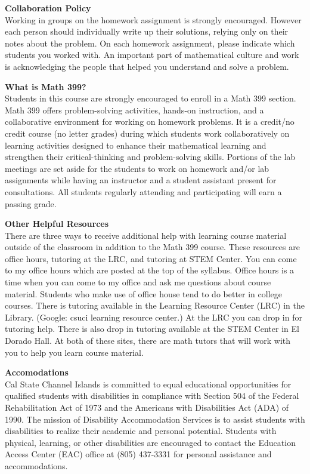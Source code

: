 \documentclass[11pt]{article}
\begin{document}
{\bf Collaboration Policy} \\
Working in groups on the homework assignment is strongly encouraged.  However each person should individually write up their solutions, relying only on their notes about the problem.  On each homework assignment, please indicate which students you worked with.  An important part of mathematical culture and work is acknowledging the people that helped you understand and solve a problem.




{\bf What is Math 399?} \\
Students in this course are strongly encouraged to enroll in a Math 399 section. Math 399 offers problem-solving activities, hands-on instruction, and a collaborative environment for working on homework problems. It is a credit/no credit course (no letter grades) during which students work collaboratively on learning activities designed to enhance their mathematical learning and strengthen their critical-thinking and problem-solving skills. Portions of the lab meetings are set aside for the students to work on homework and/or lab assignments while having an instructor and a student assistant present for consultations. All students regularly attending and participating will earn a passing grade.

{\bf Other Helpful Resources} \\
There are three ways to receive additional help with learning course material outside of the classroom in addition to the Math 399 course.  These resources are office hours, tutoring at the LRC, and tutoring at STEM Center. You can come to my office hours which are posted at the top of the syllabus.  Office hours is a time when you can come to my office and ask me questions about course material.  Students who make use of office house tend to do better in college courses. There is tutoring available in the Learning Resource Center (LRC) in the Library.  (Google: csuci learning resource center.)  At the LRC you can drop in for tutoring help.  There is also  drop in tutoring available at the STEM Center in El Dorado Hall.  At both of these sites, there are math tutors that will work with you to help you learn course material.

{\bf Accomodations} \\
Cal State Channel Islands is committed to equal educational opportunities for qualified students with disabilities in compliance with Section 504 of the Federal Rehabilitation Act of 1973 and the Americans with Disabilities Act (ADA) of 1990. The mission of Disability Accommodation Services is to assist students with disabilities to realize their academic and personal potential. Students with physical, learning, or other disabilities are encouraged to contact the Education Access Center (EAC) office at (805) 437-3331 for personal assistance and accommodations.
\end{document}
